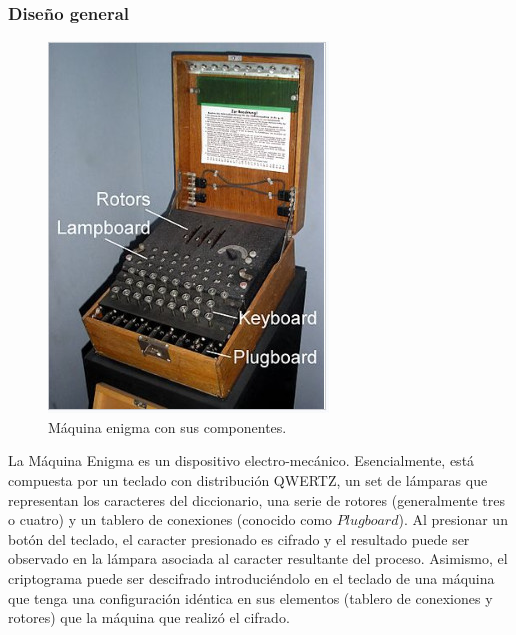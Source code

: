 \documentclass[a4paper,10pt]{article}
\begin{document}
\subsubsection{Diseño general}

\begin{figure}
    \includegraphics[width=1\linewidth]{800px-EnigmaMachineLabeled.jpg} 
    \caption{Máquina enigma con sus componentes.}
    \label{fig:wrapfig}
\end{figure}

La Máquina Enigma es un dispositivo electro-mecánico. Esencialmente, está compuesta por un teclado con distribución QWERTZ, un set de lámparas que representan los caracteres del diccionario, una serie de rotores (generalmente tres o cuatro) y un tablero de conexiones (conocido como $Plugboard$). Al presionar un botón del teclado, el caracter presionado es cifrado y el resultado puede ser observado en la lámpara asociada al caracter resultante del proceso. Asimismo, el criptograma puede ser descifrado introduciéndolo en el teclado de una máquina que tenga una configuración idéntica en sus elementos (tablero de conexiones y rotores) que la máquina que realizó el cifrado.
\end{document}
